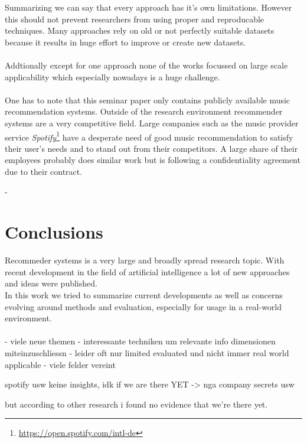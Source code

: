 \documentclass[runningheads,a4paper]{llncs}
\begin{document}
Summarizing we can say that every approach has it's own limitations. However this should not prevent researchers from using proper and reproducable techniques. 
Many approaches rely on old or not perfectly suitable datasets because 
it results in huge effort to improve or create new datasets. \\
\\
Addtionally except for one approach %
none of the works focussed on large scale applicability which especially nowadays is a huge challenge. \\
\\
One has to note that this seminar paper only contains publicly available music recommendation systems.
Outside of the research environment recommender systems are a very competitive field. 
Large companies such as the music provider service \textit{Spotify}\footnote{\url{https://open.spotify.com/intl-de}}
have a desperate need of good music recommendation to satisfy their user's needs and to stand out from their competitors. 
A large share of their employees probably does similar work but 
is following a confidentiality agreement due to their contract.   


- %

\section{Conclusions}

Recommeder systems is a very large and broadly spread research topic.
With recent development in the field of artificial intelligence a lot of new approaches and ideas were published.\\
In this work we tried to summarize current developments as well as concerns evolving around methods and evaluation, especially 
for usage in a real-world environment.\\
\\


- viele neue themen 
- interessante techniken um relevante info dimensionen miteinzuschliessn 
- leider oft nur limited evaluated und nicht immer real world applicable
- viele felder vereint 

spotify usw keine insights, idk if we are there YET
-> nga company secrets usw 

but according to other research i found no evidence that we're there yet. 
\end{document}
